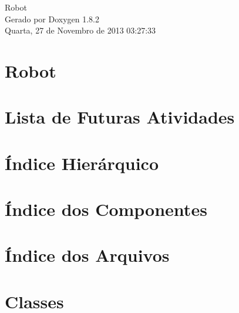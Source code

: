 \documentclass{book}
\begin{document}
\hypersetup{pageanchor=false,citecolor=blue}
\begin{titlepage}
\vspace*{7cm}
\begin{center}
{\Large Robot }\\
\vspace*{1cm}
{\large Gerado por Doxygen 1.8.2}\\
\vspace*{0.5cm}
{\small Quarta, 27 de Novembro de 2013 03:27:33}\\
\end{center}
\end{titlepage}
\clearemptydoublepage
{}
\tableofcontents
\clearemptydoublepage
{}
\hypersetup{pageanchor=true,citecolor=blue}
\chapter{Robot}
\label{index}\hypertarget{index}{}
\chapter{Lista de Futuras Atividades}
\label{todo}
\hypertarget{todo}{}

\chapter{Índice Hierárquico}

\chapter{Índice dos Componentes}

\chapter{Índice dos Arquivos}

\chapter{Classes}


















\end{document}
